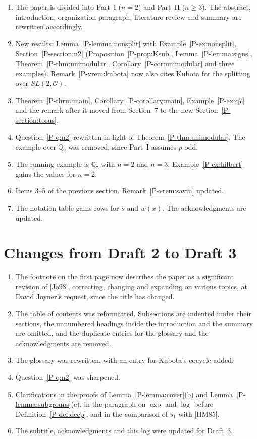 \documentclass[12pt,letterpaper]{amsart}
\newcommand{\cO}{\mathcal{O}}
\begin{document}
\begin{enumerate}[leftmargin=1.5em]
\item The paper is divided into Part~I ($n=2$) and Part~II ($n\geq 3$).
The abstract, introduction, organization paragraph, literature review
and summary are rewritten accordingly.
\item New results: Lemma~\ref{P-lemma:nonsplit} with
Example~\ref{P-ex:nonsplit}, Section~\ref{P-section:n2}
(Proposition~\ref{P-prop:Ksub}, Lemma~\ref{P-lemma:signs},
Theorem~\ref{P-thm:unimodular}, Corollary~\ref{P-cor:unimodular} and
three examples). Remark~\ref{P-vrem:kubota} now also cites Kubota for
the splitting over $SL(2,\cO)$.
\item Theorem~\ref{P-thrm:main}, Corollary~\ref{P-corollary:main},
Example~\ref{P-ex:q7} and the remark after it moved from Section~7 to
the new Section~\ref{P-section:torus}.
\item Question~\ref{P-q:n2} rewritten in light of
Theorem~\ref{P-thm:unimodular}. The example over $\mathbb{Q}_2$ was
removed, since Part~I assumes $p$ odd.
\item The running example is $\mathbb{Q}_7$ with $n=2$ and $n=3$.
Example~\ref{P-ex:hilbert} gains the values for $n=2$.
\item Items 3--5 of the previous section. Remark~\ref{P-vrem:savin}
updated.
\item The notation table gains rows for $s$ and $w(x)$. The
acknowledgments are updated.
\end{enumerate}

\section{Changes from Draft 2 to Draft 3}
\label{sec:d2d3}

\begin{enumerate}[leftmargin=1.5em]
\item The footnote on the first page now describes the paper as a
significant revision of [Jo98], correcting, changing and expanding on
various topics, at David Joyner's request, since the title has changed.
\item The table of contents was reformatted. Subsections are indented
under their sections, the unnumbered headings inside the introduction
and the summary are omitted, and the duplicate entries for the glossary
and the acknowledgments are removed.
\item The glossary was rewritten, with an entry for Kubota's cocycle
added.
\item Question~\ref{P-q:n2} was sharpened.
\item Clarifications in the proofs of Lemma~\ref{P-lemma:cover}(b) and
Lemma~\ref{P-lemma:subgroups}(e), in the paragraph on $\exp$ and $\log$
before Definition~\ref{P-def:deep}, and in the comparison of $s_1$ with
[HM85].
\item The subtitle, acknowledgments and this log were updated for
Draft~3.
\end{enumerate}
\end{document}
